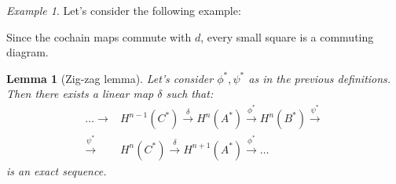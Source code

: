 \documentclass[a4paper,11pt,titlepage, article, oneside]{memoir}
\numberwithin{equation}{section}
\newtheorem{lemma}[theorem]{Lemma}
\theoremstyle{definition}
\theoremstyle{remark}
\newtheorem{example}[theorem]{Example}
\begin{document}
\begin{tcolorbox}\begin{example}\label{seqexample}
  Let's consider the following example:\\
  \begin{center}
\end{center}
Since the cochain maps commute with $d$, every small square is a commuting diagram.
\end{example}\end{tcolorbox}

\begin{lemma}[Zig-zag lemma]
  Let's consider $\phi^*, \psi^*$ as in the previous definitions. Then there exists a linear map $\delta$ such that:
  \begin{align*}
    \ldots \longrightarrow &H^{n-1}(C^*) \overset{\delta}{\longrightarrow} H^n(A^*) \overset{\phi^*}{\longrightarrow} H^n(B^*) \overset{\psi^*}{\longrightarrow} \\
    \overset{\psi^*}{\longrightarrow} &H^n(C^*) \overset{\delta}{\longrightarrow} H^{n+1}(A^*) \overset{\phi^*}{\longrightarrow} \ldots
  \end{align*}
  is an exact sequence.
\end{lemma}
\end{document}

